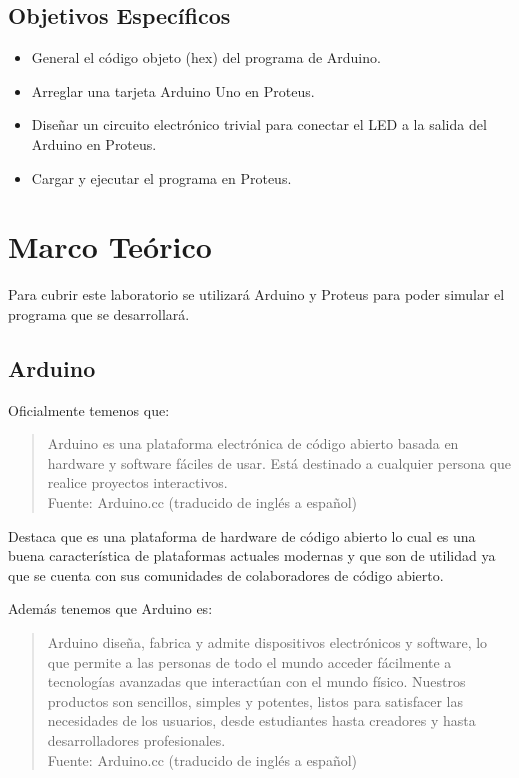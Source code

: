 \documentclass{article}
\begin{document}
\subsection{Objetivos Específicos}

\begin{itemize}
    \item General el código objeto (hex) del programa de Arduino.
    \item Arreglar una tarjeta Arduino Uno en Proteus.
    \item Diseñar un circuito electrónico trivial para conectar el LED a la salida del Arduino en Proteus.
    \item Cargar y ejecutar el programa en Proteus.
\end{itemize}

\section{Marco Teórico}

Para cubrir este laboratorio se utilizará Arduino y Proteus para poder simular el programa que se desarrollará.

\subsection{Arduino}

Oficialmente temenos que:

\begin{quote}
    Arduino es una plataforma electrónica de código abierto basada en hardware y software fáciles de usar. Está destinado a cualquier persona que realice proyectos interactivos.\\ \footnotesize
    Fuente: Arduino.cc (traducido de inglés a español) \cite{arduino-2022}
\end{quote}

Destaca que es una plataforma de hardware de código abierto lo cual es una buena característica de plataformas actuales modernas y que son de utilidad ya que se cuenta con sus comunidades de colaboradores de código abierto.

Además tenemos que Arduino es:

\begin{quote}
    Arduino diseña, fabrica y admite dispositivos electrónicos y software, lo que permite a las personas de todo el mundo acceder fácilmente a tecnologías avanzadas que interactúan con el mundo físico. Nuestros productos son sencillos, simples y potentes, listos para satisfacer las necesidades de los usuarios, desde estudiantes hasta creadores y hasta desarrolladores profesionales. \\ \footnotesize
    Fuente: Arduino.cc (traducido de inglés a español) \cite{arduino-2022}
\end{quote}
\end{document}
